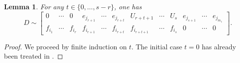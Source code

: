 \documentclass[pdftex]{sigma}
\numberwithin{equation}{section}
\newtheorem{Lemma}[Theorem]{Lemma}
\theoremstyle{definition}
\theoremstyle{plain}
\theoremstyle{plain}
\theoremstyle{plain}
\theoremstyle{plain}
\begin{document}
\begin{Lemma}{\label{lemme thm B bis}}
	For any $t \in \{0,\dots,s-r\}$, one has
	\begin{equation*}
		D \sim \begin{bmatrix}
		0 & \cdots & 0 & e_{j_{r+1}} & \cdots & e_{j_{r+t}} & U_{r+t+1} & \cdots & U_{s} & e_{j_{s+1}} & \cdots & e_{j_{m_1}} \\
		f_{i_1} & \cdots & f_{i_r} & f_{i_{r+1}} & \cdots & f_{i_{r+t}} & f_{i_{r+t+1}} & \cdots & f_{i_s} & 0 & \cdots & 0
	\end{bmatrix}.
	\end{equation*}
\end{Lemma}
\begin{proof}
	We proceed by finite induction on $t$. The initial case $t = 0$ has already been treated in .
	

\end{proof}
\end{document}
